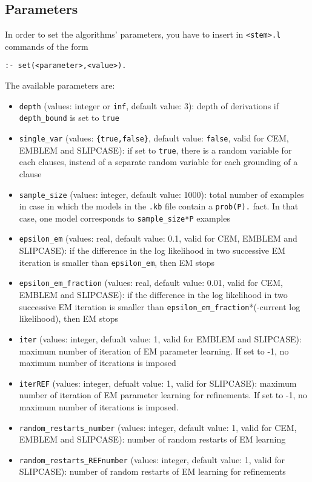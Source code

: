 \documentclass[a4paper,10pt]{article}
\begin{document}
\subsection{Parameters}
In order to set the algorithms' parameters, you have to insert in \texttt{<stem>.l}  commands of the form
\begin{verbatim}
:- set(<parameter>,<value>).
\end{verbatim}
The available parameters are:
\begin{itemize}
\item \verb|depth| (values: integer or \verb|inf|, default value: 3): depth of derivations if  \verb|depth_bound|  is set to \verb|true|
\item \verb|single_var| (values: \verb|{true,false}|, default value: \verb|false|, valid for CEM, EMBLEM and SLIPCASE): if set to \verb|true|, there is a random variable for each clauses, instead of a separate random variable for each grounding of a clause
\item \verb|sample_size| (values: integer, default value: 1000): total number of examples in case in which the models in the \verb|.kb| file contain a \verb|prob(P).| fact. In that case, one model corresponds to \verb|sample_size*P| examples
\item \verb|epsilon_em| (values: real, default value: 0.1, valid for CEM, EMBLEM and SLIPCASE): if the difference in the log likelihood in two successive EM iteration is smaller
than \verb|epsilon_em|, then EM stops 
\item \verb|epsilon_em_fraction| (values: real, default value: 0.01, valid for CEM, EMBLEM and SLIPCASE): if the difference in the log likelihood in two successive EM iteration is smaller
than \verb|epsilon_em_fraction|*(-current log likelihood), then EM stops
\item \verb|iter| (values: integer, defualt value: 1, valid for EMBLEM and SLIPCASE): maximum number of iteration of EM parameter learning. If set to -1, no maximum number of iterations is imposed
\item \verb|iterREF| (values: integer, defualt value: 1, valid for  SLIPCASE):
 maximum number of iteration of EM parameter learning for refinements. If set to -1, no maximum number of iterations is imposed.

\item \verb|random_restarts_number| (values: integer, default value: 1, valid for CEM, EMBLEM and SLIPCASE): number of random restarts of EM learning
\item \verb|random_restarts_REFnumber| (values: integer, default value: 1, valid for  SLIPCASE): number of random restarts of EM learning for refinements



\end{itemize}
\end{document}
